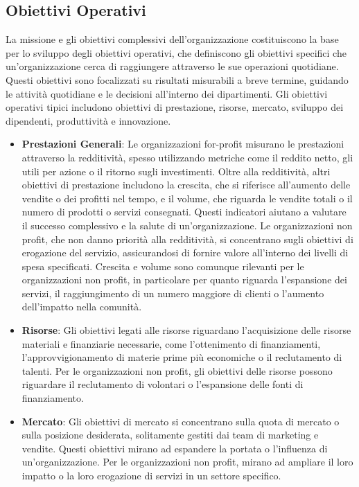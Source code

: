 \documentclass{article}
\begin{document}
\subsection{Obiettivi Operativi}
La missione e gli obiettivi complessivi dell’organizzazione costituiscono la base per lo sviluppo degli obiettivi operativi, che definiscono gli obiettivi specifici che un’organizzazione cerca di raggiungere attraverso le sue operazioni quotidiane. Questi obiettivi sono focalizzati su risultati misurabili a breve termine, guidando le attività quotidiane e le decisioni all’interno dei dipartimenti. Gli obiettivi operativi tipici includono obiettivi di prestazione, risorse, mercato, sviluppo dei dipendenti, produttività e innovazione.

\begin{itemize}
    \item \textbf{Prestazioni Generali}: Le organizzazioni for-profit misurano le prestazioni attraverso la redditività, spesso utilizzando metriche come il reddito netto, gli utili per azione o il ritorno sugli investimenti. Oltre alla redditività, altri obiettivi di prestazione includono la crescita, che si riferisce all’aumento delle vendite o dei profitti nel tempo, e il volume, che riguarda le vendite totali o il numero di prodotti o servizi consegnati. Questi indicatori aiutano a valutare il successo complessivo e la salute di un’organizzazione. Le organizzazioni non profit, che non danno priorità alla redditività, si concentrano sugli obiettivi di erogazione del servizio, assicurandosi di fornire valore all’interno dei livelli di spesa specificati. Crescita e volume sono comunque rilevanti per le organizzazioni non profit, in particolare per quanto riguarda l’espansione dei servizi, il raggiungimento di un numero maggiore di clienti o l’aumento dell’impatto nella comunità.
    
    \item \textbf{Risorse}: Gli obiettivi legati alle risorse riguardano l’acquisizione delle risorse materiali e finanziarie necessarie, come l’ottenimento di finanziamenti, l’approvvigionamento di materie prime più economiche o il reclutamento di talenti. Per le organizzazioni non profit, gli obiettivi delle risorse possono riguardare il reclutamento di volontari o l’espansione delle fonti di finanziamento.
    
    \item \textbf{Mercato}: Gli obiettivi di mercato si concentrano sulla quota di mercato o sulla posizione desiderata, solitamente gestiti dai team di marketing e vendite. Questi obiettivi mirano ad espandere la portata o l’influenza di un’organizzazione. Per le organizzazioni non profit, mirano ad ampliare il loro impatto o la loro erogazione di servizi in un settore specifico.
    

\end{itemize}
\end{document}

